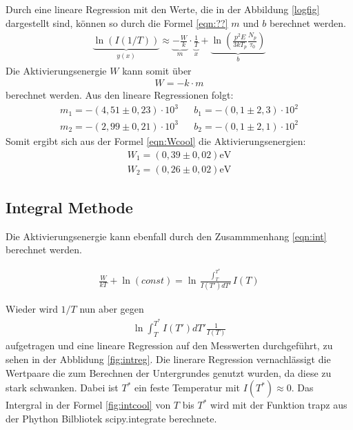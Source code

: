 Durch eine lineare Regression
mit den Werte, die in der Abbildung \ref{logfig} dargestellt sind, können
so durch die Formel \ref{eqn:??} $m$ und $b$ berechnet werden.
\begin{align}
  \underbrace{\ln(I(1/T))}_{y(x)}\approx \underbrace{-\frac{W}{k}}_{m}\cdot \underbrace{\frac1T}_{x}+\underbrace{\ln \left( \frac{p^2E}{3kT_p} \frac{N_p}{\tau_0}\right)}_{b}
\end{align}
Die Aktivierungsenergie $W$ kann somit über
\begin{align}
  W=-k\cdot m \label{eqn:Wcool}
\end{align}
berechnet werden.
Aus den lineare Regressionen folgt:
\begin{align*}
  m_1=-(4,51\pm0,23)\cdot10^{3}    &  &b_1=-(0,1\pm2,3)\cdot10^{2}\\
  m_2=-(2,99\pm0,21)\cdot10^{3}    &  &b_2=-(0,1\pm2,1)\cdot10^{2}
\end{align*}
Somit ergibt sich aus der Formel \eqref{eqn:Wcool} die Aktivierungsenergien:
\begin{align*}
  W_1=(0,39\pm0,02)\si{\electronvolt}\\
  W_2=(0,26\pm0,02)\si{\electronvolt}
\end{align*}

\subsection{Integral Methode}
Die Aktivierungsenergie kann ebenfall durch den Zusammmenhang \eqref{eqn:int}
berechnet werden.

\begin{align}
  \frac{W}{kT}+\ln{(const)}=\ln \frac{\int_T^{T^*}}{I(T')dT'}{I(T)} \label{eqn:int}
\end{align}

Wieder wird $1/T$ nun aber gegen
\begin{align}
  \ln \int_T^{T^*}I(T')dT'\frac{1}{I(T)} \label{eqn:intcool}
\end{align}
aufgetragen und eine
lineare Regression auf den Messwerten durchgeführt,
zu sehen in der Abblidung \ref{fig:intreg}.
Die linerare Regression vernachlässigt die Wertpaare
die zum Berechnen der Untergrundes genutzt wurden,
da diese zu stark schwanken.
Dabei ist $T^*$ ein feste Temperatur mit $I(T^*)\approx 0$.
Das Intergral in der Formel \ref{fig:intcool} von $T$ bis $T^*$
wird mit der Funktion trapz aus der Phython Bilbliotek scipy.integrate
berechnete.


